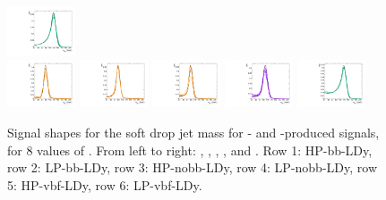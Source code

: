 \begin{figure}[htbp]
  \includegraphics[width=0.18\textwidth]{fig/analysis/templateSignalVsMX_fromDC_WprToWH_MJJ_mu_HP_vbf_DEtaLo.pdf}\\
  \includegraphics[width=0.18\textwidth]{fig/analysis/templateSignalVsMX_fromDC_GbuToWW_MJJ_mu_LP_vbf_DEtaLo.pdf}
  \includegraphics[width=0.18\textwidth]{fig/analysis/templateSignalVsMX_fromDC_RadToWW_MJJ_mu_LP_vbf_DEtaLo.pdf}
  \includegraphics[width=0.18\textwidth]{fig/analysis/templateSignalVsMX_fromDC_ZprToWW_MJJ_mu_LP_vbf_DEtaLo.pdf}
  \includegraphics[width=0.18\textwidth]{fig/analysis/templateSignalVsMX_fromDC_WprToWZ_MJJ_mu_LP_vbf_DEtaLo.pdf}
  \includegraphics[width=0.18\textwidth]{fig/analysis/templateSignalVsMX_fromDC_WprToWH_MJJ_mu_LP_vbf_DEtaLo.pdf}\\
  \caption{
    Signal shapes for the soft drop jet mass \MJ for \ggF- and \DY-produced signals, for 8 values of \MX.
    From left to right: \GBulktoWW, \RadtoWW, \ZprtoWW, \WprtoWZ, and \WprtoWH.
    Row 1: HP-bb-LDy, row 2: LP-bb-LDy, row 3: HP-nobb-LDy, row 4: LP-nobb-LDy, row 5: HP-vbf-LDy, row 6: LP-vbf-LDy.
  }
  \label{fig:MJJShapes_NonVBF_LDy_Run2}
\end{figure}

